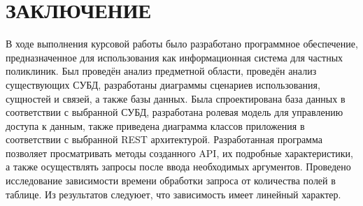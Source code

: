 \section*{ЗАКЛЮЧЕНИЕ}
В  ходе  выполнения  курсовой работы  было  разработано  программное обеспечение, предназначенное для использования как информационная система для частных поликлиник.
Был проведён анализ предметной области, проведён анализ существующих СУБД, разработаны диаграммы сценариев использования, сущностей и связей, а также базы данных.
Была спроектирована база данных в соответствии с выбранной СУБД, разработана ролевая модель для управлению доступа к данным,  также приведена диаграмма классов приложения в соответствии с выбранной REST архитектурой.
Разработанная программа позволяет просматривать методы созданного API, их подробные характеристики, а также осуществлять запросы после ввода необходимых аргументов.
Проведено исследование зависимости времени обработки запроса от количества полей в таблице. Из результатов следуюет, что зависимость имеет линейный характер.

\pagebreak